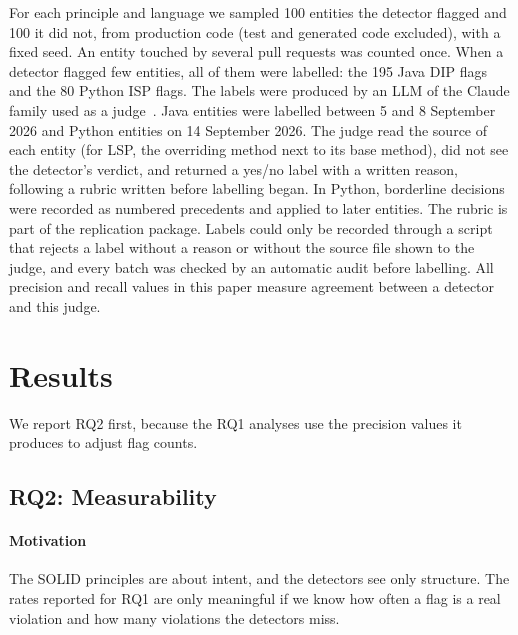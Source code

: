 \documentclass[sigconf]{acmart}
\begin{document}
For each principle and language we sampled 100 entities the detector flagged and 100 it did not, from
production code (test and generated code excluded), with a fixed seed. An entity touched by several pull requests was counted once. When
a detector flagged few entities, all of them were labelled: the 195 Java DIP flags and the 80 Python
ISP flags. The labels were produced by an LLM of the Claude family used as a
judge~\cite{zheng2023llmjudge}. Java entities were labelled between 5 and 8 September 2026 and
Python entities on 14 September 2026. The judge read the source of each entity (for LSP, the overriding
method next to its base method), did not see the detector's verdict, and returned a yes/no label with
a written reason, following a rubric written before labelling began. In Python, borderline
decisions were recorded as numbered precedents and applied to later entities. The rubric is part of
the replication package. Labels could only be recorded
through a script that rejects a label without a reason or without the source file shown to the
judge, and every batch was checked by an automatic audit before labelling. All precision and recall
values in this paper measure agreement between a detector and this judge.

\section{Results}
\label{sec:results}

We report RQ2 first, because the RQ1 analyses use the precision values it produces to adjust flag
counts.

\subsection{RQ2: Measurability}
\label{sec:measure}

\paragraph{Motivation} The SOLID principles are about intent, and the detectors see only structure.
The rates reported for RQ1 are only meaningful if we know how often a flag is a real violation and
how many violations the detectors miss.
\end{document}
